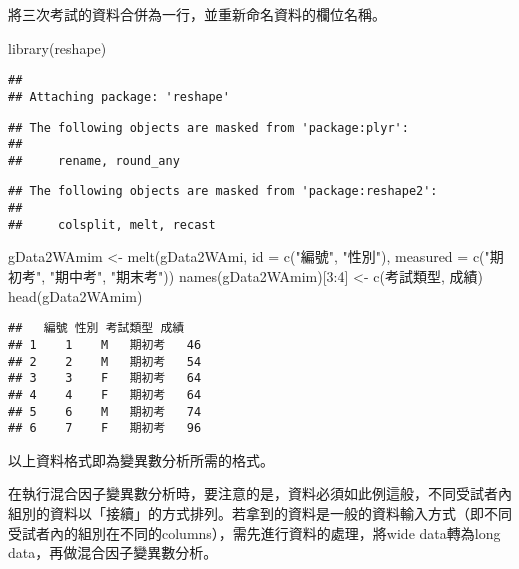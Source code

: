\documentclass[
]{book}
\newenvironment{Shaded}{\begin{snugshade}}{\end{snugshade}}
\newcommand{\AttributeTok}[1]{\textcolor[rgb]{0.77,0.63,0.00}{#1}}
\newcommand{\DecValTok}[1]{\textcolor[rgb]{0.00,0.00,0.81}{#1}}
\newcommand{\FunctionTok}[1]{\textcolor[rgb]{0.00,0.00,0.00}{#1}}
\newcommand{\NormalTok}[1]{#1}
\newcommand{\OtherTok}[1]{\textcolor[rgb]{0.56,0.35,0.01}{#1}}
\newcommand{\SpecialCharTok}[1]{\textcolor[rgb]{0.00,0.00,0.00}{#1}}
\newcommand{\StringTok}[1]{\textcolor[rgb]{0.31,0.60,0.02}{#1}}
\begin{document}
將三次考試的資料合併為一行，並重新命名資料的欄位名稱。

\begin{Shaded}
\begin{Highlighting}[]
\FunctionTok{library}\NormalTok{(reshape)}
\end{Highlighting}
\end{Shaded}

\begin{verbatim}
## 
## Attaching package: 'reshape'
\end{verbatim}

\begin{verbatim}
## The following objects are masked from 'package:plyr':
## 
##     rename, round_any
\end{verbatim}

\begin{verbatim}
## The following objects are masked from 'package:reshape2':
## 
##     colsplit, melt, recast
\end{verbatim}

\begin{Shaded}
\begin{Highlighting}[]
\NormalTok{gData2WAmim }\OtherTok{\textless{}{-}} \FunctionTok{melt}\NormalTok{(gData2WAmi, }\AttributeTok{id =} \FunctionTok{c}\NormalTok{(}\StringTok{"編號"}\NormalTok{, }\StringTok{"性別"}\NormalTok{), }\AttributeTok{measured =} \FunctionTok{c}\NormalTok{(}\StringTok{"期初考"}\NormalTok{, }\StringTok{"期中考"}\NormalTok{, }\StringTok{"期末考"}\NormalTok{))}
\FunctionTok{names}\NormalTok{(gData2WAmim)[}\DecValTok{3}\SpecialCharTok{:}\DecValTok{4}\NormalTok{] }\OtherTok{\textless{}{-}} \FunctionTok{c}\NormalTok{(}\StringTok{\textquotesingle{}考試類型\textquotesingle{}}\NormalTok{, }\StringTok{\textquotesingle{}成績\textquotesingle{}}\NormalTok{)}
\FunctionTok{head}\NormalTok{(gData2WAmim)}
\end{Highlighting}
\end{Shaded}

\begin{verbatim}
##   編號 性別 考試類型 成績
## 1    1    M   期初考   46
## 2    2    M   期初考   54
## 3    3    F   期初考   64
## 4    4    F   期初考   64
## 5    6    M   期初考   74
## 6    7    F   期初考   96
\end{verbatim}

以上資料格式即為變異數分析所需的格式。

在執行混合因子變異數分析時，要注意的是，資料必須如此例這般，不同受試者內組別的資料以「接續」的方式排列。若拿到的資料是一般的資料輸入方式（即不同受試者內的組別在不同的columns），需先進行資料的處理，將wide data轉為long data，再做混合因子變異數分析。
\end{document}
